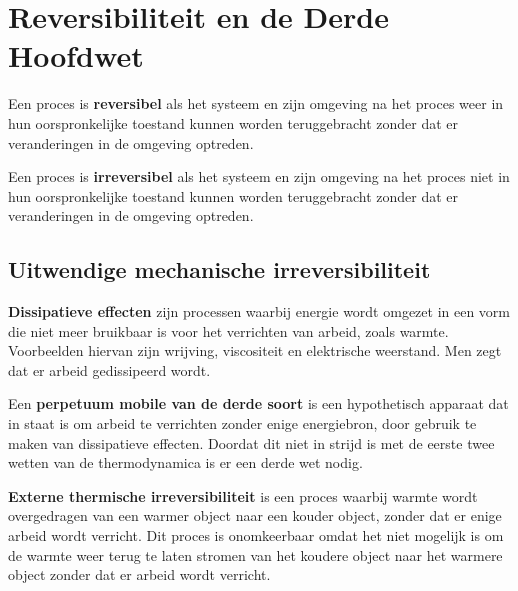 \section{Reversibiliteit en de Derde Hoofdwet}

\begin{definition}
    Een proces is \textbf{reversibel} als het systeem en zijn omgeving na het proces weer in hun oorspronkelijke toestand kunnen worden teruggebracht zonder dat er veranderingen in de omgeving optreden.
\end{definition}
\begin{definition}
    Een proces is \textbf{irreversibel} als het systeem en zijn omgeving na het proces niet in hun oorspronkelijke toestand kunnen worden teruggebracht zonder dat er veranderingen in de omgeving optreden.
\end{definition}

\subsection{Uitwendige mechanische irreversibiliteit}
\begin{definition}
    \textbf{Dissipatieve effecten} zijn processen waarbij energie wordt omgezet in een vorm die niet meer bruikbaar is voor het verrichten van arbeid, zoals warmte.
    Voorbeelden hiervan zijn wrijving, viscositeit en elektrische weerstand. Men zegt dat er arbeid gedissipeerd wordt.
\end{definition}

\begin{definition}
    Een \textbf{perpetuum mobile van de derde soort} is een hypothetisch apparaat dat in staat is om arbeid te verrichten zonder enige energiebron, door gebruik te maken van dissipatieve effecten.
    Doordat dit niet in strijd is met de eerste twee wetten van de thermodynamica is er een derde wet nodig.
\end{definition}

\begin{definition}
    \textbf{Externe thermische irreversibiliteit} is een proces waarbij warmte wordt overgedragen van een warmer object naar een kouder object, zonder dat er enige arbeid wordt verricht.
    Dit proces is onomkeerbaar omdat het niet mogelijk is om de warmte weer terug te laten stromen van het koudere object naar het warmere object zonder dat er arbeid wordt verricht.
\end{definition}

